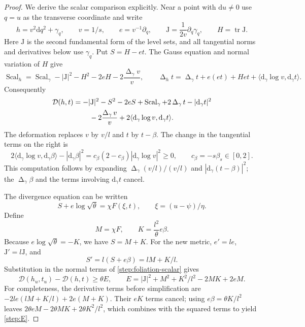 \documentclass[11pt]{article}
\numberwithin{equation}{section}
\theoremstyle{definition}
\theoremstyle{remark}
\begin{document}
\begin{proof}
We derive the scalar comparison explicitly.  Near a point with $\mathrm d u\ne0$
use $q=u$ as the transverse coordinate and write
\[
 h=v^2\mathrm d q^2+\gamma_q,\qquad v=1/s,\qquad
 e=v^{-1}\partial_q,\qquad
 \mathrm J=\frac1{2v}\partial_q\gamma_q,\qquad H=\operatorname{tr}\mathrm J.
\]
Here $\mathrm J$ is the second fundamental form of the level sets,
and all tangential norms and derivatives below use $\gamma_q$.
Put $S=H-et$.  The Gauss equation and normal variation of $H$ give
\[
 \operatorname{Scal}_h=\operatorname{Scal}_{\gamma}-|\mathrm J|^2-H^2-2eH
              -2\frac{\operatorname{\Delta}_{\gamma}v}{v},
 \qquad
 \operatorname{\Delta}_ht=\operatorname{\Delta}_{\gamma}t+e(et)+H et
           +\langle\mathrm d_\gamma\log v,\mathrm d_\gamma t\rangle.
\]
Consequently
\begin{align}
 \mathcal D(h,t)
 &=-|\mathrm J|^2-S^2-2eS+\operatorname{Scal}_\gamma
    +2\operatorname{\Delta}_\gamma t-|\mathrm d_\gamma t|^2\notag\\
 &\hspace{8mm}-2\frac{\operatorname{\Delta}_\gamma v}{v}
    +2\langle\mathrm d_\gamma\log v,\mathrm d_\gamma t\rangle.
 \label{step:foliation-scalar}
\end{align}
The deformation replaces $v$ by $v/l$ and $t$ by $t-\beta$.
The change in the tangential terms on the right is
\[
 2\langle\mathrm d_\gamma\log v,\mathrm d_\gamma\beta\rangle
       -|\mathrm d_\gamma\beta|^2
 =c_\beta(2-c_\beta)|\mathrm d_\gamma\log v|^2\ge0,
 \qquad c_\beta=-s\beta_s\in[0,2].
\]
This computation follows by expanding
$\operatorname{\Delta}_\gamma(v/l)/(v/l)$ and $|\mathrm d_\gamma(t-\beta)|^2$;
the $\operatorname{\Delta}_\gamma\beta$ and the terms involving $\mathrm d_\gamma t$ cancel.

The divergence equation can be written
\[
 S+e\log\sqrt\theta=\chi F(\xi,t),\qquad
 \xi=(u-\psi)/\eta.
\]
Define
\[
 M=\chi F,\qquad K=\frac{l^2}{\theta}e\beta.
\]
Because $e\log\sqrt\theta=-K$, we have $S=M+K$.
For the new metric, $e'=le$, $\mathrm J'=l\mathrm J$, and
\[
 S'=l(S+e\beta)=lM+K/l.
\]
Substitution in the normal terms of \cref{step:foliation-scalar} gives
\begin{equation}\label{step:E}
 \mathcal D(h_u,t_u)-\mathcal D(h,t)\ge\theta E,
 \qquad E=|\mathrm J|^2+M^2+K^2/l^2-2MK+2eM.
\end{equation}
For completeness, the derivative terms before simplification are
$-2le(lM+K/l)+2e(M+K)$.  Their $eK$ terms cancel; using
$e\beta=\theta K/l^2$ leaves $2\theta eM-2\theta MK+
2\theta K^2/l^2$, which combines with the squared terms to yield
\cref{step:E}.


\end{proof}
\end{document}
